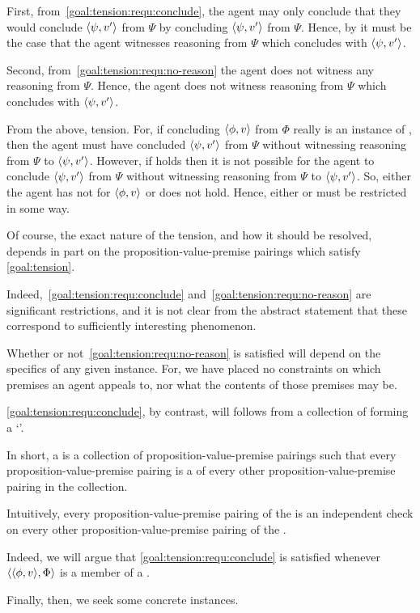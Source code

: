 \begin{note}[Goal]
  First, from~\autoref{goal:tension:requ:conclude}, the agent may only conclude that they would conclude \(\langle \psi, v' \rangle\) from \(\Psi\) by concluding \(\langle \psi, v' \rangle\) from \(\Psi\).
  Hence, by \ESU{} it must be the case that the agent witnesses reasoning from \(\Psi\) which concludes with \(\langle \psi, v' \rangle\).

  Second, from~\autoref{goal:tension:requ:no-reason} the agent does not witness any reasoning from \(\Psi\).
  Hence, the agent does not witness reasoning from \(\Psi\) which concludes with \(\langle \psi, v' \rangle\).

  From the above, tension.
  For, if concluding \(\langle \phi, v \rangle\) from \(\Phi\) really is an instance of \csN{}, then the agent must have concluded \(\langle \psi, v' \rangle\) from \(\Psi\) without witnessing reasoning from \(\Psi\) to \(\langle \psi, v' \rangle\).
  However, if \ESU{} holds then it is not possible for the agent to conclude \(\langle \psi, v' \rangle\) from \(\Psi\) without witnessing reasoning from \(\Psi\) to \(\langle \psi, v' \rangle\).
  So, either the agent has not \csN{} for \(\langle \phi, v \rangle\) or \ESU{} does not hold.
  Hence, either \csN{} or \ESU{} must be restricted in some way.

  Of course, the exact nature of the tension, and how it should be resolved, depends in part on the proposition-value-premise pairings which satisfy \autoref{goal:tension}.

  Indeed,~\autoref{goal:tension:requ:conclude} and~\autoref{goal:tension:requ:no-reason} are significant restrictions, and it is not clear from the abstract statement that these correspond to sufficiently interesting phenomenon.
\end{note}

\begin{note}
  Whether or not~\autoref{goal:tension:requ:no-reason} is satisfied will depend on the specifics of any given instance.
  For, we have placed no constraints on which premises an agent appeals to, nor what the contents of those premises may be.

  \autoref{goal:tension:requ:conclude}, by contrast, will follows from a collection of  forming a `\cluster{}'.

  In short, a \cluster{} is a collection of proposition-value-premise pairings such that every proposition-value-premise pairing is a \requ{} of every other proposition-value-premise pairing in the collection.

  Intuitively, every proposition-value-premise pairing of the  is an independent check on every other proposition-value-premise pairing of the .

  Indeed, we will argue that \autoref{goal:tension:requ:conclude} is satisfied whenever \(\langle \langle \phi, v \rangle, \Phi \rangle\) is a member of a \cluster{}.

  Finally, then, we seek some concrete instances.
\end{note}

